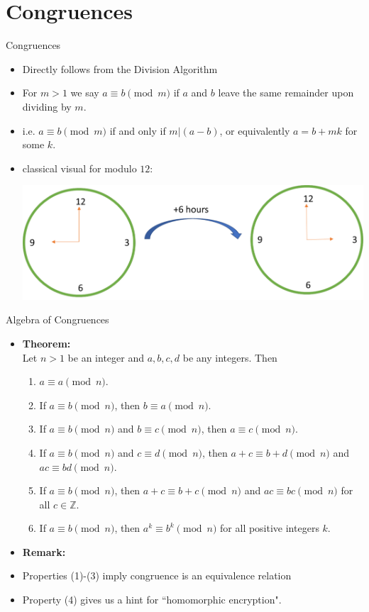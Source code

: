 \documentclass[ %
 usenames,dvipsnames,
aspectratio=169,11pt ]{beamer}
\newenvironment{stepitemize}{\begin{itemize}[<+->]}{\end{itemize} }
\newcommand{\Z}{\mathbb{Z}}
\begin{document}
\section{Congruences}
\begin{frame}{Congruences}
\begin{stepitemize}
\item Directly follows from the Division Algorithm
\item For $m>1$ we say $a\equiv b \pmod{m}$ if $a$ and $b$ leave the same remainder upon dividing by $m$.
\item i.e. $a\equiv b \pmod{m}$ if and only if $m|(a-b)$, or equivalently $a=b+mk$ for some $k$.
\item classical visual for modulo $12$:
    \begin{center}
    \includegraphics[scale=.35]{clock.pdf}
\end{center}

\end{stepitemize}
\end{frame}

\begin{frame}{Algebra of Congruences}
\begin{stepitemize}

\item[]{\bf Theorem:}\\
Let $n>1$ be an integer and $a, b, c, d$ be any integers. Then

\begin{enumerate}
    \item $a\equiv a \pmod{n}$.
    \item If $a\equiv b \pmod{n}$, then $b\equiv a \pmod{n}$.
    \item If $a\equiv b \pmod{n}$ and $b\equiv c \pmod{n}$, then $a\equiv c \pmod{n}$.
    \item If $a\equiv b \pmod{n}$ and $c\equiv d \pmod{n}$, then $a+c\equiv b+d \pmod{n}$ and $ac\equiv bd \pmod{n}$.
    \item If $a\equiv b \pmod{n}$, then $a+c\equiv b+c \pmod{n}$ and $ac\equiv bc \pmod{n}$ for all $c\in \Z$.
    \item If $a\equiv b \pmod{n}$, then $a^k \equiv b^k \pmod{n}$ for all positive integers $k$.
\end{enumerate}

\medskip
\item {\bf Remark:}
    \item Properties (1)-(3) imply congruence is an equivalence relation
    \item Property (4) gives us a hint for ``homomorphic encryption".
\end{stepitemize}
\end{frame}
\end{document}
